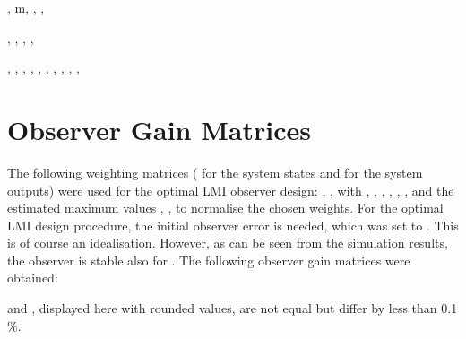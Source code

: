 \documentclass[a4paper]{article}
\begin{document}
,  m, , ,

\newline , , , , 

\newline , , , ,
\newline , , , ,
, , 



\section{\label{Sec_ObserverGains}Observer Gain Matrices}

The following weighting matrices ( for the system states and  for the system outputs) were used for the optimal LMI observer design:
\newline ,
 , 
\newline with , , , , , ,  and the estimated maximum values
\newline , 
,
 to normalise the chosen weights.
\newline For the optimal LMI design procedure, the initial observer error is needed, which was set to . This is of course an idealisation. However, as can be seen from the simulation results, the observer is stable also for .
\newline The following observer gain matrices were obtained:

\newline  and , displayed here with rounded values, are not equal but differ by less than 0.1 \%.




\end{document}
